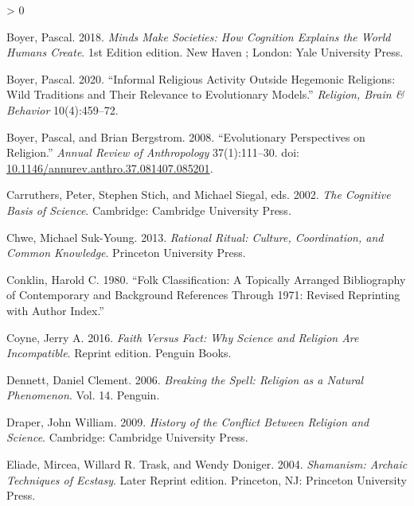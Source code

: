 \documentclass[
  11pt,
]{article}
\newlength{\cslhangindent}
\newenvironment{CSLReferences}[2] %
 {%
  \setlength{\parindent}{0pt}
  \ifodd #1 \everypar{\setlength{\hangindent}{\cslhangindent}}\ignorespaces\fi
  \ifnum #2 > 0
  \setlength{\parskip}{#2\baselineskip}
  \fi
 }%
 {}
\begin{document}
\begin{CSLReferences}{1}{0}
\leavevmode\hypertarget{ref-boyerMindsMakeSocieties2018}{}%
Boyer, Pascal. 2018. \emph{Minds {Make Societies}: {How Cognition Explains} the {World Humans Create}}. 1st Edition edition. {New Haven ; London}: {Yale University Press}.

\leavevmode\hypertarget{ref-boyer2020informal}{}%
Boyer, Pascal. 2020. {``Informal Religious Activity Outside Hegemonic Religions: Wild Traditions and Their Relevance to Evolutionary Models.''} \emph{Religion, Brain \& Behavior} 10(4):459--72.

\leavevmode\hypertarget{ref-boyerEvolutionaryPerspectivesReligion2008}{}%
Boyer, Pascal, and Brian Bergstrom. 2008. {``Evolutionary {Perspectives} on {Religion}.''} \emph{Annual Review of Anthropology} 37(1):111--30. doi: \href{https://doi.org/10.1146/annurev.anthro.37.081407.085201}{10.1146/annurev.anthro.37.081407.085201}.

\leavevmode\hypertarget{ref-carruthersCognitiveBasisScience2002}{}%
Carruthers, Peter, Stephen Stich, and Michael Siegal, eds. 2002. \emph{The {Cognitive Basis} of {Science}}. {Cambridge}: {Cambridge University Press}.

\leavevmode\hypertarget{ref-chwe2013rational}{}%
Chwe, Michael Suk-Young. 2013. \emph{Rational Ritual: {Culture}, Coordination, and Common Knowledge}. {Princeton University Press}.

\leavevmode\hypertarget{ref-conklin1980folk}{}%
Conklin, Harold C. 1980. {``Folk Classification: A Topically Arranged Bibliography of Contemporary and Background References Through 1971: Revised Reprinting with Author Index.''}

\leavevmode\hypertarget{ref-coyneFaithFactWhy2016}{}%
Coyne, Jerry A. 2016. \emph{Faith {Versus Fact}: {Why Science} and {Religion Are Incompatible}}. Reprint edition. {Penguin Books}.

\leavevmode\hypertarget{ref-dennett2006breaking}{}%
Dennett, Daniel Clement. 2006. \emph{Breaking the Spell: {Religion} as a Natural Phenomenon}. Vol. 14. {Penguin}.

\leavevmode\hypertarget{ref-draperHistoryConflictReligion2009}{}%
Draper, John William. 2009. \emph{History of the {Conflict} Between {Religion} and {Science}}. {Cambridge}: {Cambridge University Press}.

\leavevmode\hypertarget{ref-eliadeShamanismArchaicTechniques2004}{}%
Eliade, Mircea, Willard R. Trask, and Wendy Doniger. 2004. \emph{Shamanism: {Archaic Techniques} of {Ecstasy}}. Later Reprint edition. {Princeton, NJ}: {Princeton University Press}.


\end{CSLReferences}
\end{document}
